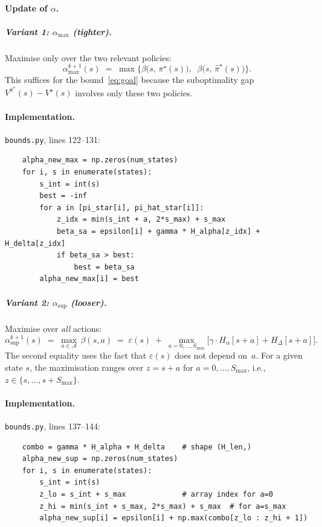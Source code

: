 \documentclass[11pt]{article}
\newcommand{\Smax}{S_{\max}}
\newcommand{\pistar}{\pi^\star}
\newcommand{\pihatstar}{\hat\pi^\star}
\newcommand{\Vstar}{V^\star}
\newcommand{\Vpihat}{V^{\pihatstar}}
\begin{document}
\paragraph{Update of $\alpha$.}

\subparagraph{Variant 1: $\alpha_{\max}$ (tighter).}
Maximise only over the two relevant policies:
\begin{equation}\label{eq:alpha-max}
  \alpha^{k+1}_{\max}(s)
  \;=\; \max\!\Big\{
    \beta\bigl(s,\, \pistar(s)\bigr),\;\;
    \beta\bigl(s,\, \pihatstar(s)\bigr)
  \Big\}.
\end{equation}
This suffices for the bound~\eqref{eq:goal} because the suboptimality gap
$\Vpihat(s) - \Vstar(s)$ involves only these two policies.

\paragraph{Implementation.}
\texttt{bounds.py}, lines 122--131:
\begin{verbatim}
    alpha_new_max = np.zeros(num_states)
    for i, s in enumerate(states):
        s_int = int(s)
        best = -inf
        for a in [pi_star[i], pi_hat_star[i]]:
            z_idx = min(s_int + a, 2*s_max) + s_max
            beta_sa = epsilon[i] + gamma * H_alpha[z_idx] + H_delta[z_idx]
            if beta_sa > best:
                best = beta_sa
        alpha_new_max[i] = best
\end{verbatim}

\subparagraph{Variant 2: $\alpha_{\sup}$ (looser).}
Maximise over \emph{all} actions:
\begin{equation}\label{eq:alpha-sup}
  \alpha^{k+1}_{\sup}(s)
  \;=\; \max_{a \in \mathcal{A}}\, \beta(s, a)
  \;=\; \varepsilon(s)
  \;+\; \max_{a = 0, \ldots, \Smax}
        \bigl[\gamma \cdot H_\alpha[s+a] + H_\Delta[s+a]\bigr].
\end{equation}
The second equality uses the fact that $\varepsilon(s)$ does not depend on~$a$.
For a given state $s$, the maximisation ranges over $z = s + a$ for
$a = 0, \ldots, \Smax$, i.e., $z \in \{s, \ldots, s + \Smax\}$.

\paragraph{Implementation.}
\texttt{bounds.py}, lines 137--144:
\begin{verbatim}
    combo = gamma * H_alpha + H_delta    # shape (H_len,)
    alpha_new_sup = np.zeros(num_states)
    for i, s in enumerate(states):
        s_int = int(s)
        z_lo = s_int + s_max             # array index for a=0
        z_hi = min(s_int + s_max, 2*s_max) + s_max  # for a=s_max
        alpha_new_sup[i] = epsilon[i] + np.max(combo[z_lo : z_hi + 1])
\end{verbatim}
\end{document}
